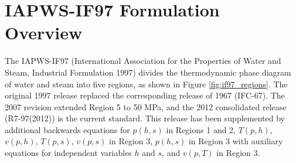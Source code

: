 \documentclass{article}
\begin{document}
\section{IAPWS-IF97 Formulation Overview}

The IAPWS-IF97 (International Association for the Properties of Water and Steam, Industrial Formulation 1997) \cite{IAPWS-IF97} divides the thermodynamic phase diagram of water and steam into five regions, as shown in Figure \ref{fig:if97_regions}. The original 1997 release replaced the corresponding release of 1967 (IFC-67). The 2007 revision extended Region 5 to 50 MPa, and the 2012 consolidated release (R7-97(2012)) is the current standard. This release has been supplemented by additional backwards equations for $p(h,s)$ in Regions 1 and 2, $T(p,h)$, $v(p,h)$, $T(p,s)$, $v(p,s)$ in Region 3, $p(h,s)$ in Region 3 with auxiliary equations for independent variables $h$ and $s$, and $v(p,T)$ in Region 3.
\end{document}
